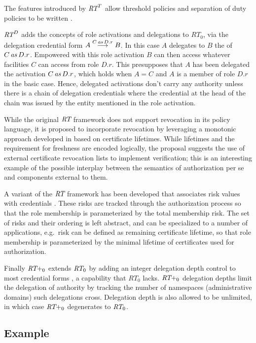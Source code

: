 The features introduced by $\RT^T$ allow threshold policies and separation of duty policies to
be written \cite{Li:DRBTMF}.

$\RT^D$ adds the concepts of role activations and delegations to $RT_0$, via the delegation
credential form $\delcred{A}{B}{\activation{C}{D.r}}$. In this case $A$ delegates to $B$ the
 of $\activation{C}{D.r}$. Empowered with this role activation $B$ can
then access whatever facilities $C$ can access from role $D.r$. This presupposes that $A$ has
been delegated the activation $\activation{C}{D.r}$, which holds when $A = C$ and $A$ is a
member of role $D.r$ in the basic case. Hence, delegated activations don't carry any authority
unless there is a chain of delegation credentials where the credential at the head of the chain
was issued by the entity mentioned in the role activation.

While the original $\RT$ framework does not support revocation in its policy language, it is
proposed to incorporate revocation \cite{Li:DRBTMF} by leveraging a monotonic approach developed
in \cite{lbi-fc01} based on certificate lifetimes. While lifetimes and the requirement for
freshness are encoded logically, the proposal suggests the use of external certificate
revocation lists to implement verification; this is an interesting example of the possible
interplay between the semantics of authorization per se and components external to them.

A variant of the $\RT$ framework has been developed that associates risk values with credentials
\cite{skalka-wang-chapin-jcs06}. These risks are tracked through the authorization process so
that the role membership is parameterized by the total membership risk. The set of risks and
their ordering is left abstract, and can be specialized to a number of applications, e.g.~risk
can be defined as remaining certificate lifetime, so that role membership is parameterized by
the minimal lifetime of certificates used for authorization.

Finally $\RT+_0$ extends $\RT_0$ by adding an integer delegation depth control to most
credential forms \cite{Hong:DDCTMS}, a capability that $RT_0$ lacks. $\RT+_0$ delegation depths
limit the delegation of authority by tracking the number of namespaces (administrative domains)
such delegations cross. Delegation depth is also allowed to be unlimited, in which case $\RT+_0$
degenerates to $\RT_0$.

\subsection{Example}

